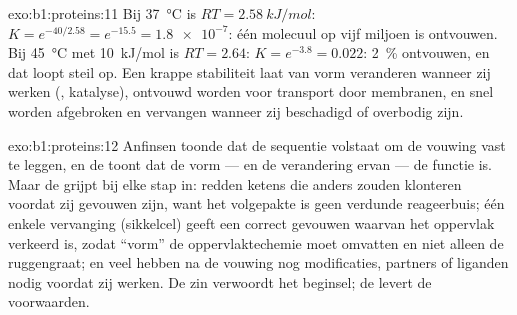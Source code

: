 \begin{solution}{exo:b1:proteins:11}
Bij \qty{37}{\celsius} is $RT = \qty{2.58}{kJ/mol}$: $K = e^{-40/2.58} =
e^{-15.5} = \num{1.8e-7}$: één molecuul op vijf miljoen is ontvouwen. Bij
\qty{45}{\celsius} met \qty{10}{kJ/mol} is $RT = 2.64$: $K = e^{-3.8} =
0.022$: \qty{2}{\%} ontvouwen, en dat loopt steil op. Een krappe stabiliteit laat
 van vorm veranderen wanneer zij werken (, katalyse), ontvouwd
worden voor transport door membranen, en snel worden afgebroken en vervangen
wanneer zij beschadigd of overbodig zijn.
\end{solution}

\begin{solution}{exo:b1:proteins:12}
Anfinsen toonde dat de sequentie volstaat om de vouwing vast te leggen, en de
 toont dat de vorm --- en de verandering ervan --- de functie is. Maar de
 grijpt bij elke stap in:  redden ketens die anders zouden klonteren
voordat zij gevouwen zijn, want het volgepakte  is geen verdunde
reageerbuis; één enkele vervanging (sikkelcel) geeft een correct gevouwen 
waarvan het oppervlak verkeerd is, zodat ``vorm'' de oppervlaktechemie moet
omvatten en niet alleen de ruggengraat; en veel  hebben na de vouwing nog
modificaties, partners of liganden nodig voordat zij werken. De zin verwoordt het
beginsel; de  levert de voorwaarden.
\end{solution}

